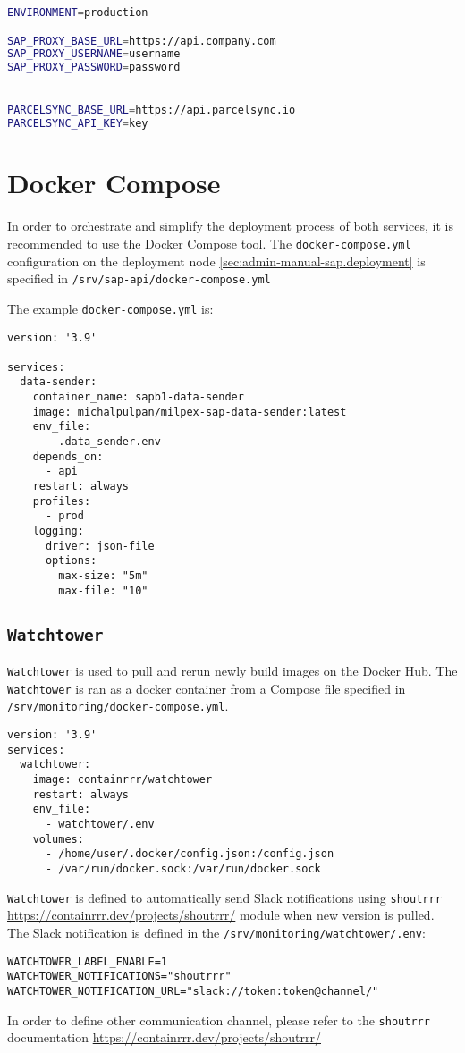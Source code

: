 \begin{lstlisting}[language=bash,caption={Data sender environment configuration}]
ENVIRONMENT=production

SAP_PROXY_BASE_URL=https://api.company.com
SAP_PROXY_USERNAME=username
SAP_PROXY_PASSWORD=password


PARCELSYNC_BASE_URL=https://api.parcelsync.io
PARCELSYNC_API_KEY=key
\end{lstlisting}


\section{Docker Compose}
In order to orchestrate and simplify the deployment process of both services, it is recommended to use the Docker Compose tool.
The \texttt{docker-compose.yml} configuration on the deployment node \ref{sec:admin-manual-sap.deployment} is specified in \texttt{/srv/sap-api/docker-compose.yml}

The example \texttt{docker-compose.yml} is:
\begin{lstlisting}[caption={Data-sender \texttt{docker-compose.yml}}]
version: '3.9'

services:
  data-sender:
    container_name: sapb1-data-sender
    image: michalpulpan/milpex-sap-data-sender:latest
    env_file:
      - .data_sender.env
    depends_on:
      - api
    restart: always
    profiles:
      - prod
    logging:
      driver: json-file
      options:
        max-size: "5m"
        max-file: "10"

\end{lstlisting}

\subsection{\texttt{Watchtower}}
\texttt{Watchtower} is used to pull and rerun newly build images on the Docker Hub.
The \texttt{Watchtower} is ran as a docker container from a Compose file specified in \texttt{/srv/monitoring/docker-compose.yml}.

\begin{lstlisting}[caption={Watchtower \texttt{docker-compose.yml}}]
version: '3.9'
services:
  watchtower:
    image: containrrr/watchtower
    restart: always
    env_file:
      - watchtower/.env
    volumes:
      - /home/user/.docker/config.json:/config.json
      - /var/run/docker.sock:/var/run/docker.sock
\end{lstlisting}

\texttt{Watchtower} is defined to automatically send Slack notifications using \texttt{shoutrrr} \url{https://containrrr.dev/projects/shoutrrr/} module when new version is pulled. The Slack notification is defined in the \texttt{/srv/monitoring/watchtower/.env}:
\begin{lstlisting}[caption={Watchtower environment variables}]
WATCHTOWER_LABEL_ENABLE=1
WATCHTOWER_NOTIFICATIONS="shoutrrr"
WATCHTOWER_NOTIFICATION_URL="slack://token:token@channel/"
\end{lstlisting}
In order to define other communication channel, please refer to the \texttt{shoutrrr} documentation \url{https://containrrr.dev/projects/shoutrrr/}

